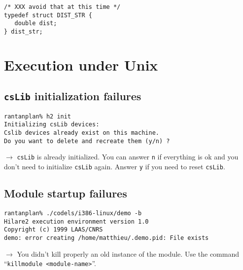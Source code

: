 \begin{center}\begin{cartouche}\small\begin{verbatim}
/* XXX avoid that at this time */
typedef struct DIST_STR {
   double dist;
} dist_str;
\end{verbatim}\end{cartouche}\end{center}


\section{Execution under Unix}

\subsection{\texttt{csLib} initialization failures}

\begin{center}\begin{cartouche}\small\begin{verbatim}
rantanplan% h2 init
Initializing csLib devices: 
Cslib devices already exist on this machine.
Do you want to delete and recreate them (y/n) ? 
\end{verbatim}\end{cartouche}\end{center}

$\rightarrow$ \texttt{csLib} is already initialized.  You can answer \texttt{n}
if  everything is  ok  and  you  don't   need to initialize  \texttt{csLib}
again. Answer \texttt{y} if you need to reset \texttt{csLib}.


\subsection{Module startup failures}

\begin{center}\begin{cartouche}\small\begin{verbatim}
rantanplan% ./codels/i386-linux/demo -b
Hilare2 execution environment version 1.0
Copyright (c) 1999 LAAS/CNRS
demo: error creating /home/matthieu/.demo.pid: File exists
\end{verbatim}\end{cartouche}\end{center}

$\rightarrow$ You didn't kill properly an old instance of the module. Use
the command ``\texttt{killmodule <module-name>}''.


